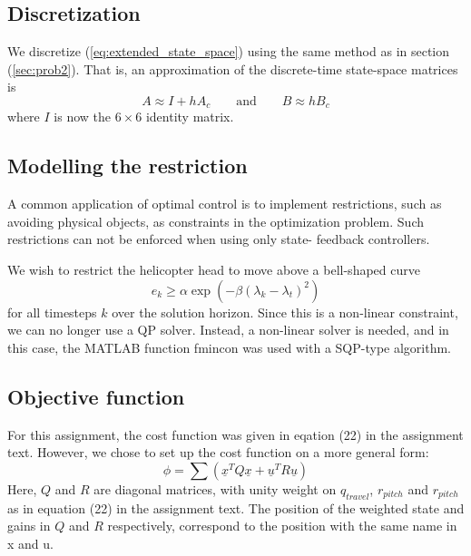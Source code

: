 \subsection{Discretization}
We discretize (\ref{eq:extended_state_space}) using the same method
as in section (\ref{sec:prob2}). That is, an approximation of the
discrete-time state-space matrices is
\begin{equation}
    A \approx I + hA_c
    \qquad\text{and}\qquad
    B \approx hB_c
\end{equation}
where $I$ is now the $6\times6$ identity matrix.

\subsection{Modelling the restriction}
A common application of optimal control is to implement restrictions,
such as avoiding physical objects, as constraints in the optimization
problem. Such restrictions can not be enforced when using only state-
feedback controllers.

We wish to restrict the helicopter head to move above a bell-shaped curve
\begin{equation}
    e_k \geq \alpha \exp (-\beta (\lambda_k - \lambda_t)^2 )
\end{equation}
for all timesteps $k$ over the solution horizon. Since this is a non-linear constraint, we can no longer use a QP solver. Instead, a non-linear solver is needed, and in this case, the MATLAB function fmincon was used with a SQP-type algorithm.


\subsection{Objective function}
For this assignment, the cost function was given in eqation (22) in the assignment text. However, we chose to set up the cost function on a more general form:
\begin{equation}
    \phi=\sum(\underline{x}^{T}Q\underline{x}+\underline{u}^{T}R\underline{u})
\end{equation}
Here, $Q$ and $R$ are diagonal matrices, with unity weight on $q_{travel}$, $r_{pitch}$ and $r_{pitch}$ as in equation (22) in the assignment text. %
The position of the weighted state and gains in $Q$ and $R$ respectively, correspond to the position with the same name in x and u. %

